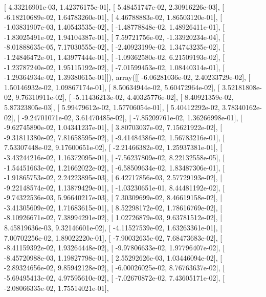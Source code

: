 \documentclass{article}
\begin{document}
       [  4.33216901e-03,   1.42376175e-01],
       [  5.48451747e-02,   2.30916226e-03],
       [ -6.18210689e-02,   1.64783260e-01],
       [  4.46788883e-02,   1.86503120e-01],
       [ -1.03831907e-03,   1.40543535e-02],
       [ -1.48778848e-02,   1.48926411e-01],
       [ -1.83025491e-02,   1.94104387e-01],
       [  7.59721756e-02,  -1.33920234e-04],
       [ -8.01888635e-05,   7.17030555e-02],
       [ -2.40923199e-02,   1.34743235e-02],
       [ -1.24846472e-01,   1.43977444e-01],
       [ -1.09362580e-02,   6.21509193e-02],
       [ -1.23787240e-02,   1.95115192e-02],
       [ -7.01599453e-02,   1.08440314e-01],
       [ -1.29364934e-02,   1.39380615e-01]]), array([[ -6.06281036e-02,   2.40233729e-02],
       [  1.50146932e-02,   1.09867174e-01],
       [  8.50634944e-02,   5.60472964e-02],
       [  3.52181808e-02,   9.76310911e-02],
       [ -5.11436213e-02,   4.40325776e-02],
       [  8.40921359e-02,   5.87323805e-03],
       [  5.99479612e-02,   1.57706054e-01],
       [  5.40412292e-02,   3.78340162e-02],
       [ -9.24701071e-02,   3.61470485e-02],
       [ -7.85209761e-02,   1.36266998e-01],
       [ -9.62745890e-02,   1.04341237e-01],
       [  3.80703037e-02,   7.15621922e-02],
       [ -9.31811380e-02,   7.81658595e-02],
       [ -9.41484386e-02,   1.56783216e-01],
       [  7.53307448e-02,   9.17600651e-02],
       [ -2.21466382e-02,   1.25937381e-01],
       [ -3.43244216e-02,   1.16372095e-01],
       [ -7.56237809e-02,   8.22132558e-05],
       [ -1.54451663e-02,   1.21662022e-02],
       [ -6.58509634e-02,   1.83487306e-01],
       [ -1.91865753e-02,   2.24223895e-03],
       [  6.42717856e-03,   2.57729193e-02],
       [ -9.22148574e-02,   1.13879429e-01],
       [ -1.03230651e-01,   8.44481192e-02],
       [ -9.74322536e-03,   5.96640217e-03],
       [  7.30309699e-02,   8.46619158e-02],
       [ -3.41305609e-02,   1.71683615e-01],
       [  8.52298172e-02,   1.78616769e-02],
       [ -8.10926671e-02,   7.38994291e-02],
       [  1.02726879e-03,   9.63781512e-02],
       [  8.45819636e-03,   9.32146601e-02],
       [ -4.11527539e-02,   1.63263361e-01],
       [  7.00702256e-02,   1.89022220e-01],
       [ -7.90032635e-02,   7.68473683e-02],
       [ -8.41159392e-02,   1.93264448e-02],
       [ -9.97806633e-02,   1.97796407e-02],
       [ -8.45720988e-03,   1.19827798e-01],
       [  2.55292626e-03,   1.03446094e-02],
       [ -2.89324656e-02,   9.85942128e-02],
       [ -6.00026025e-02,   8.76763637e-02],
       [ -5.69495413e-02,   4.97595610e-02],
       [ -7.02670872e-02,   7.43605171e-02],
       [ -2.08066335e-02,   1.75514021e-01],
\end{document}
